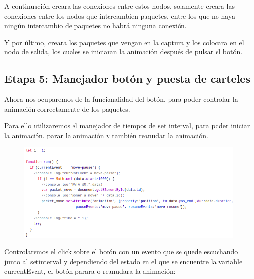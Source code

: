 \documentclass[a4paper, 12pt]{book}
\begin{document}
A continuación creara las conexiones entre estos nodos, solamente creara las conexiones entre los nodos que intercambien paquetes, entre los que no haya ningún intercambio de paquetes no habrá ninguna conexión.

Y por último, creara los paquetes que vengan en la captura y los colocara en el nodo de salida, los cuales se iniciaran la animación después de pulsar el botón.

\subsection{Etapa 5: Manejador botón y puesta de carteles}
Ahora nos ocuparemos de la funcionalidad del botón, para poder controlar la animación correctamente de los paquetes.

Para ello utilizaremos el manejador de tiempos de set interval, para poder iniciar la animación, parar la animación y también reanudar la animación.
\begin{figure}[h]
\centering
    \includegraphics[scale=0.52]{img/func_run.png}
\end{figure}


Controlaremos el click sobre el botón con un evento que se quede escuchando junto al setinterval y dependiendo del estado en el que se encuentre la variable currentEvent, el botón parara o reanudara la animación:
\end{document}

